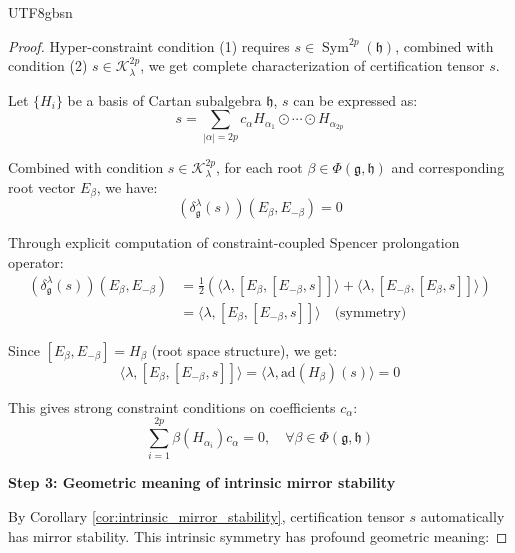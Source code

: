 \documentclass[a4paper,12pt]{extarticle}
\theoremstyle{definition}
\begin{document}
\begin{CJK}{UTF8}{gbsn}
\begin{proof}
Hyper-constraint condition (1) requires $s \in \operatorname{Sym}^{2p}(\mathfrak{h})$, combined with condition (2) $s \in \mathcal{K}^{2p}_\lambda$, we get complete characterization of certification tensor $s$.

Let $\{H_i\}$ be a basis of Cartan subalgebra $\mathfrak{h}$, $s$ can be expressed as:
\begin{equation}
\label{eq:cartan_representation}
s = \sum_{|\alpha|=2p} c_\alpha H_{\alpha_1} \odot \cdots \odot H_{\alpha_{2p}}
\end{equation}

Combined with condition $s \in \mathcal{K}^{2p}_\lambda$, for each root $\beta \in \Phi(\mathfrak{g}, \mathfrak{h})$ and corresponding root vector $E_\beta$, we have:
\begin{equation}
\label{eq:root_constraint}
(\delta^\lambda_\mathfrak{g}(s))(E_\beta, E_{-\beta}) = 0
\end{equation}

Through explicit computation of constraint-coupled Spencer prolongation operator:
\begin{align}
(\delta^\lambda_\mathfrak{g}(s))(E_\beta, E_{-\beta}) &= \frac{1}{2}\left(\langle \lambda, [E_\beta, [E_{-\beta}, s]]\rangle + \langle \lambda, [E_{-\beta}, [E_\beta, s]]\rangle\right) \label{eq:spencer_root_computation_1}\\
&= \langle \lambda, [E_\beta, [E_{-\beta}, s]]\rangle \quad \text{(symmetry)}\label{eq:spencer_root_computation_2}
\end{align}

Since $[E_\beta, E_{-\beta}] = H_\beta$ (root space structure), we get:
\begin{equation}
\label{eq:cartan_constraint_detailed}
\langle \lambda, [E_\beta, [E_{-\beta}, s]]\rangle = \langle \lambda, \text{ad}(H_\beta)(s)\rangle = 0
\end{equation}

This gives strong constraint conditions on coefficients $c_\alpha$:
\begin{equation}
\label{eq:coefficient_constraint}
\sum_{i=1}^{2p} \beta(H_{\alpha_i}) c_\alpha = 0, \quad \forall \beta \in \Phi(\mathfrak{g}, \mathfrak{h})
\end{equation}

\textbf{Step 3: Geometric meaning of intrinsic mirror stability}

By Corollary \ref{cor:intrinsic_mirror_stability}, certification tensor $s$ automatically has mirror stability. This intrinsic symmetry has profound geometric meaning:


\end{proof}
\end{CJK}
\end{document}
